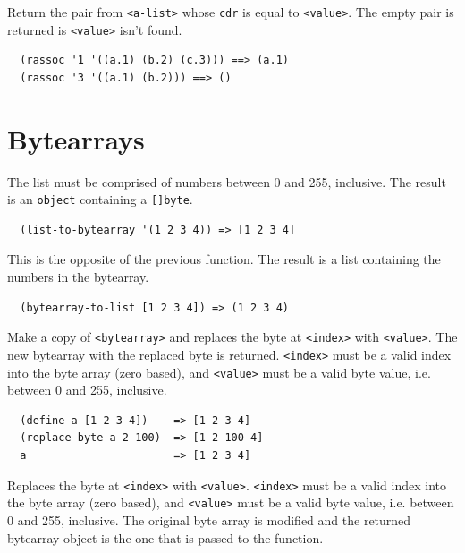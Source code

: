 \documentclass[12pt]{article}
\begin{document}

Return the pair from \verb|<a-list>| whose \verb|cdr| is equal to
\verb|<value>|. The empty pair is returned is \verb|<value>| isn't found.

\begin{verbatim}
  (rassoc '1 '((a.1) (b.2) (c.3))) ==> (a.1)
  (rassoc '3 '((a.1) (b.2))) ==> ()
\end{verbatim}

\section{Bytearrays}


The list must be comprised of numbers between 0 and 255, inclusive.
The result is an \verb|object| containing a \verb|[]byte|.

\begin{verbatim}
  (list-to-bytearray '(1 2 3 4)) => [1 2 3 4]
\end{verbatim}


This is the opposite of the previous function. The result is a list
containing the numbers in the bytearray.

\begin{verbatim}
  (bytearray-to-list [1 2 3 4]) => (1 2 3 4)
\end{verbatim}


Make a copy of \verb|<bytearray>| and replaces the byte at
\verb|<index>| with \verb|<value>|. The new bytearray with the
replaced byte is returned.
\verb|<index>| must be a valid index into the byte array (zero based), and
\verb|<value>| must be a valid byte value, i.e. between 0 and 255, inclusive.

\begin{verbatim}
  (define a [1 2 3 4])    => [1 2 3 4]
  (replace-byte a 2 100)  => [1 2 100 4]
  a                       => [1 2 3 4]
\end{verbatim}


Replaces the byte at \verb|<index>| with \verb|<value>|.
\verb|<index>| must be a valid index into the byte array (zero based), and
\verb|<value>| must be a valid byte value, i.e. between 0 and 255,
inclusive. The original byte array is modified and the returned
bytearray object is the one that is passed to the function.
\end{document}
